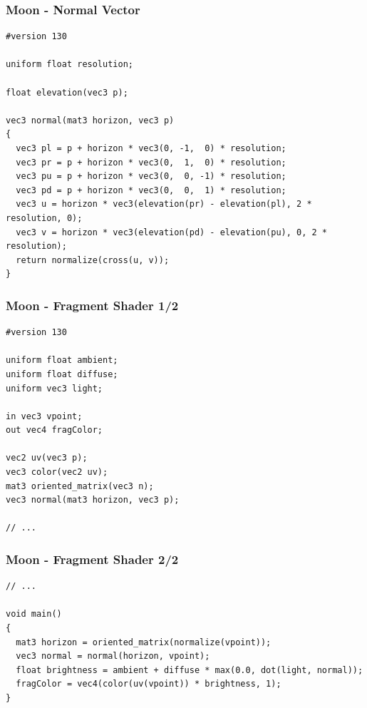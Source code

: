 \documentclass[aspectratio=169,11pt,xcolor=dvipsnames]{beamer}
\begin{document}
\begin{frame}[fragile]
  \frametitle{Moon {-} Normal Vector}
  \begin{verbatim}
#version 130

uniform float resolution;

float elevation(vec3 p);

vec3 normal(mat3 horizon, vec3 p)
{
  vec3 pl = p + horizon * vec3(0, -1,  0) * resolution;
  vec3 pr = p + horizon * vec3(0,  1,  0) * resolution;
  vec3 pu = p + horizon * vec3(0,  0, -1) * resolution;
  vec3 pd = p + horizon * vec3(0,  0,  1) * resolution;
  vec3 u = horizon * vec3(elevation(pr) - elevation(pl), 2 * resolution, 0);
  vec3 v = horizon * vec3(elevation(pd) - elevation(pu), 0, 2 * resolution);
  return normalize(cross(u, v));
}
  \end{verbatim}
\end{frame}

\begin{frame}[fragile]
  \frametitle{Moon {-} Fragment Shader 1/2}
  \begin{verbatim}
#version 130

uniform float ambient;
uniform float diffuse;
uniform vec3 light;

in vec3 vpoint;
out vec4 fragColor;

vec2 uv(vec3 p);
vec3 color(vec2 uv);
mat3 oriented_matrix(vec3 n);
vec3 normal(mat3 horizon, vec3 p);

// ...
  \end{verbatim}
\end{frame}

\begin{frame}[fragile]
  \frametitle{Moon {-} Fragment Shader 2/2}
  \begin{verbatim}
// ...

void main()
{
  mat3 horizon = oriented_matrix(normalize(vpoint));
  vec3 normal = normal(horizon, vpoint);
  float brightness = ambient + diffuse * max(0.0, dot(light, normal));
  fragColor = vec4(color(uv(vpoint)) * brightness, 1);
}
  \end{verbatim}
\end{frame}
\end{document}
